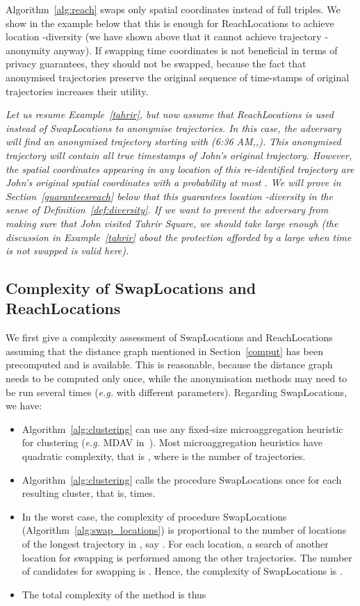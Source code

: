 Algorithm~\ref{alg:reach} swaps
only spatial coordinates instead of full triples.
We show in the example below that this is enough
for ReachLocations to achieve location -diversity
(we have shown above that it cannot achieve trajectory
-anonymity anyway). If swapping time coordinates
is not beneficial in terms of privacy guarantees,
they should not be swapped, because the fact that
anonymised trajectories preserve the original sequence
of time-stamps of original trajectories increases their utility.

\begin{example}{\em
Let us resume Example~\ref{tahrir}, but now assume that
ReachLocations is used instead of SwapLocations to anonymise
trajectories. In this case, the adversary will find
an anonymised trajectory starting with (6:36 AM,,).
This anonymised trajectory will contain all true timestamps of John's
original trajectory. However, the spatial coordinates appearing
in any location of this re-identified trajectory are John's
original spatial coordinates with a probability at most .
We will prove in Section~\ref{guaranteesreach} below that this guarantees
location -diversity in the sense of
Definition~\ref{def:diversity}. If we want to prevent the adversary
from making sure that John visited Tahrir Square, we should
take  large enough (the discussion in Example~\ref{tahrir}
about the protection afforded by a large  when time is
not swapped is valid here).
}\end{example}

\subsection{Complexity of SwapLocations and ReachLocations}
\label{sec:complex}

We first give a complexity assessment of SwapLocations and
ReachLocations assuming that the distance graph
mentioned in Section~\ref{comput}
has been precomputed and is available.
This is reasonable, because
the distance graph needs to be computed only once, while the anonymisation
methods may need to be run several times ({\em e.g.} with different parameters).
Regarding SwapLocations, we have:
\begin{itemize}
\item Algorithm~\ref{alg:clustering} can use
any fixed-size microaggregation heuristic for clustering
({\em e.g.} MDAV in~\cite{domingo05}). Most microaggregation heuristics
have quadratic complexity, that is , where  is the number
of trajectories.
\item Algorithm~\ref{alg:clustering} calls the procedure
SwapLocations once for each resulting cluster, that is,
 times.
\item In the worst case, the complexity of procedure SwapLocations
(Algorithm~\ref{alg:swap_locations}) is proportional
to the number of locations of the longest trajectory in ,
say .
For each location, a search of another
location for swapping is performed among
the other  trajectories. The number of candidates
for swapping is . Hence, the complexity
of SwapLocations is .
\item The total complexity of the method is thus

\end{itemize}


